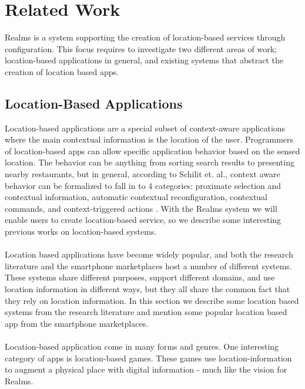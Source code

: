 \section{Related Work} %
\label{sec:related_work}
Realms is a system supporting the creation of location-based services through configuration. This focus requires to investigate two different areas of work; location-based applications in general, and existing systems that abstract the creation of location based apps.

\subsection{Location-Based Applications} %
\label{sub:agumented_spaces}
Location-based applications are a special subset of context-aware applications where the main contextual information is the location of the user. Programmers of location-based apps can allow specific application behavior based on the sensed location. The behavior can be anything from sorting search results to presenting nearby restaurants, but in general, according to Schilit et. al., context aware behavior can be formalized to fall in to 4 categories: proximate selection and contextual information, automatic contextual reconfiguration, contextual commands, and context-triggered actions \cite{512740}. With the Realms system we will enable users to create location-based service, so we describe some interesting previous works on location-based systems.
\\\\
Location based applications have become widely popular, and both the research literature and the smartphone marketplaces host a number of different systems. These systems share different purposes, support different domains, and use location information in different ways, but they all share the common fact that they rely on location information. In this section we describe some location based systems from the research literature and mention some popular location based app from the smartphone marketplaces.
\\\\
Location-based application come in many forms and genres. One interesting category of apps is location-based games. These games use location-information to augment a physical place with digital information - much like the vision for Realms. 
\\\\
